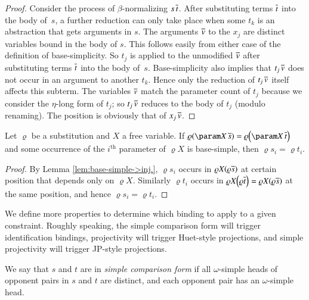   \begin{proof}
  Consider the process of $\beta$-normalizing $s\,\overline{t}$. After substituting
  terms $\overline{t}$ into the body of~$s$, a further reduction can only
  take place when some $t_{k}$ is an abstraction that gets arguments in
  $s$. The arguments $\overline{v}$ to the $x_{j}$ are distinct variables
  bound in the body of $s$. This follows easily from either case of the
  definition of base-simplicity. So $t_{j}$ is applied to the unmodified
  $\overline{v}$ after substituting
  terms $\overline{t}$ into the body of~$s$. Base-simplicity also implies
  that $t_{j}\,\overline{v}$ does not occur in an argument to another
  $t_{k}$. Hence only the reduction of $t_{j}\,\overline{v}$ itself affects this
  subterm. The variables $\overline{v}$ match the parameter count of $t_{j}$
  because we consider the $\eta$-long form of $t_{j}$; so $t_{j}\,\overline{v}$ reduces to the body
  of $t_{j}$ (modulo renaming). The position is obviously that of $x_{j}\,\overline{v}$.
  \end{proof}
  \begin{lemma}[$\jp C{4 strengthened}$]\label{lem:eq-if-omega-simple}Let $\varrho$ be a substitution and $X$ a free
    variable. If $\varrho\left(\param X\,\seq s\right)=\varrho\left(\param X\,\seq t\right)$
    and some occurrence of the $i^{\text{th}}$ parameter of $\varrho X$
    is base-simple, then $\varrho s_{i}=\varrho t_{i}$.
    \end{lemma}
    \begin{proof}
    By Lemma \ref{lem:base-simple->inj.}, $\varrho s_{i}$ occurs in
    $\varrho X\left(\varrho\seq s\right)$ at certain position that depends
    only on $\varrho X$. Similarly $\varrho t_{i}$ occurs in $\varrho X\left(\varrho\seq t\right)=\varrho X\left(\varrho\seq s\right)$
    at the same position, and hence $\varrho s_{i}=\varrho t_{i}$.
    \end{proof}
    We define more properties to determine which binding to apply to a given constraint.
    Roughly speaking, the simple comparison form will trigger identification bindings,
    projectivity will trigger Huet-style projections, and
    simple projectivity will trigger JP-style projections.
    \begin{defi}[$\jp D4$]
    \label{unif:def:simple-comparison-form}We say that $s$ and $t$ are in \emph{simple
    comparison form }if all $\omega$-simple heads of opponent pairs in $s$ and $t$ are distinct, and
    each opponent pair has an $\omega$-simple head.
    \end{defi}
